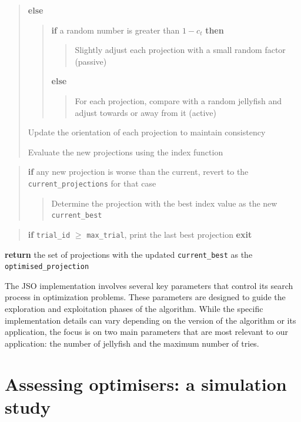 \documentclass[
  12pt,
]{interact}
\theoremstyle{plain}
\begin{document}
\begin{tcolorbox}
\begin{quote}
\textbf{else}

\begin{quote}
\textbf{if} a random number is greater than \(1 - c_t\) \textbf{then}

\begin{quote}
Slightly adjust each projection with a small random factor (passive)
\end{quote}

\textbf{else}

\begin{quote}
For each projection, compare with a random jellyfish and adjust towards
or away from it (active)
\end{quote}
\end{quote}

Update the orientation of each projection to maintain consistency

Evaluate the new projections using the index function
\end{quote}

\begin{quote}
\textbf{if} any new projection is worse than the current, revert to the
\texttt{current\_projections} for that case

\begin{quote}
Determine the projection with the best index value as the new
\texttt{current\_best}
\end{quote}
\end{quote}

\begin{quote}
\textbf{if} \texttt{trial\_id} \(\ge\) \texttt{max\_trial}, print the
last best projection \textbf{exit}
\end{quote}

\textbf{return} the set of projections with the updated
\texttt{current\_best} as the \texttt{optimised\_projection}

\end{tcolorbox}

The JSO implementation involves several key parameters that control its
search process in optimization problems. These parameters are designed
to guide the exploration and exploitation phases of the algorithm. While
the specific implementation details can vary depending on the version of
the algorithm or its application, the focus is on two main parameters
that are most relevant to our application: the number of jellyfish and
the maximum number of tries.

\hypertarget{sec-sim-deets}{%
\section{Assessing optimisers: a simulation study}\label{sec-sim-deets}}
\end{document}
